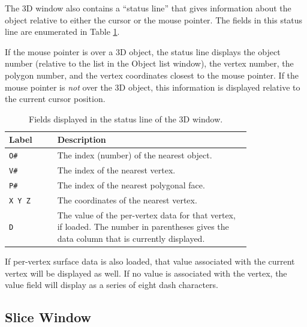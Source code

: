 \documentclass[11pt,letterpaper]{article}
\newcommand{\ident}[1]{{\tt #1}}
\begin{document}
The 3D window also contains a ``status line'' that gives information about
the object relative to either the cursor or the mouse pointer. The fields
in this status line are enumerated in Table \ref{tab3DFields}.

If the mouse pointer is over a 3D object, the status line displays the
object number (relative to the list in the Object list window), the
vertex number, the polygon number, and the vertex coordinates closest
to the mouse pointer. If the mouse pointer is {\em not} over the 3D
object, this information is displayed relative to the current cursor
position.

\begin{table}
\centering
\caption{Fields displayed in the status line of the 3D window.}
\begin{tabular}{lp{0.8\linewidth}}
Label & Description \\
\hline
\ident{O\#} & The index (number) of the nearest object. \\
\ident{V\#} & The index of the nearest vertex. \\
\ident{P\#} & The index of the nearest polygonal face. \\
\ident{X Y Z} & The coordinates of the nearest vertex. \\
\ident{D} & The value of the per-vertex data for that vertex, if
loaded. The number in parentheses gives the data column that is
currently displayed.\\
\hline
\end{tabular}
\label{tab3DFields}
\end{table}

If per-vertex surface data is also loaded, that value associated with
the current vertex will be displayed as well. If no value is associated
with the vertex, the value field will display as a series of eight 
dash characters.

\subsection{Slice Window}
\end{document}
